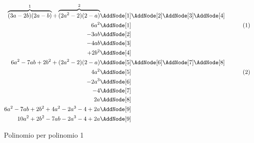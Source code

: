 \begin{figure}
\begin{NodesList}
	\begin{align*}
		\overbrace{(3a-2b)(2a-b)}^{1}+\overbrace{(2a^2-2)(2-a)}^{2}&\nonumber\AddNode[1]\AddNode[2]\AddNode[3]\AddNode[4]\\
		6a^2&\AddNode[1]&\tag{1}\\ 
		-3ab&\AddNode[2]&\\
		-4ab&\AddNode[3]&\\    
		+2b^2&\AddNode[4]&\\
		6a^2-7ab+2b^2+(2a^2-2)(2-a)&\nonumber\AddNode[5]\AddNode[6]\AddNode[7]\AddNode[8]\\
		4a^2&\AddNode[5]&\tag{2}\\
		-2a^3&\AddNode[6]&\\
		-4 &\AddNode[7]&\\   
		2a&\AddNode[8]&\\   
		6a^2-7ab+2b^2+4a^2-2a^3-4+2a&\nonumber\AddNode[9]\\
		10a^2+2b^2-7ab-2a^3-4+2a&\nonumber\AddNode[9]
	\end{align*}
\end{NodesList}

	\caption[]{Polinomio per polinomio 1}
	\label{fig:polinomioperpolinomio1}
\end{figure}

